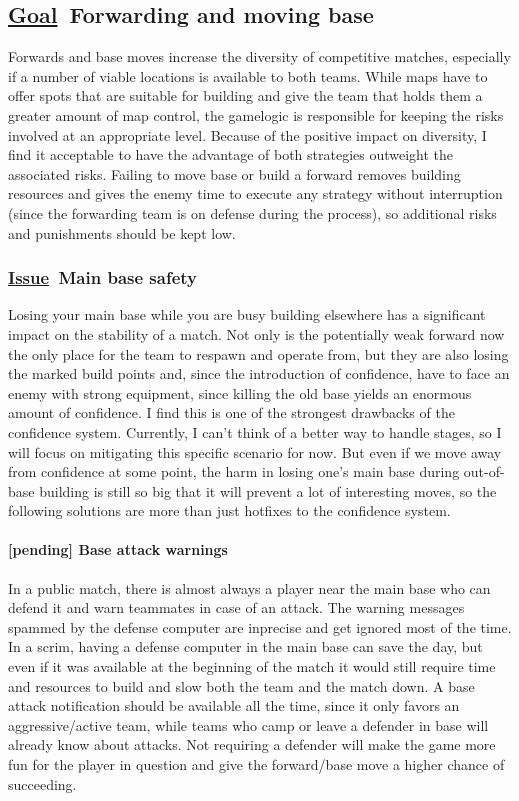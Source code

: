 \documentclass{scrartcl}
\newcommand{\goal}     [0]{\textbf{\underline{Goal}\ }}
\newcommand{\issue}    [0]{\textbf{\underline{Issue}\ }}
\newcommand{\pending}  [0]{\textcolor{pending}  {\textbf{[pending] }}}
\begin{document}
\subsection{\goal Forwarding and moving base}

Forwards and base moves increase the diversity of competitive matches, especially if a number of viable locations is available to both teams. While maps have to offer spots that are suitable for building and give the team that holds them a greater amount of map control, the gamelogic is responsible for keeping the risks involved at an appropriate level. Because of the positive impact on diversity, I find it acceptable to have the advantage of both strategies outweight the associated risks. Failing to move base or build a forward removes building resources and gives the enemy time to execute any strategy without interruption (since the forwarding team is on defense during the process), so additional risks and punishments should be kept low.

\subsubsection{\issue Main base safety}

Losing your main base while you are busy building elsewhere has a significant impact on the stability of a match. Not only is the potentially weak forward now the only place for the team to respawn and operate from, but they are also losing the marked build points and, since the introduction of confidence, have to face an enemy with strong equipment, since killing the old base yields an enormous amount of confidence. I find this is one of the strongest drawbacks of the confidence system. Currently, I can't think of a better way to handle stages, so I will focus on mitigating this specific scenario for now. But even if we move away from confidence at some point, the harm in losing one's main base during out-of-base building is still so big that it will prevent a lot of interesting moves, so the following solutions are more than just hotfixes to the confidence system.

\paragraph{\pending Base attack warnings}

In a public match, there is almost always a player near the main base who can defend it and warn teammates in case of an attack. The warning messages spammed by the defense computer are inprecise and get ignored most of the time. In a scrim, having a defense computer in the main base can save the day, but even if it was available at the beginning of the match it would still require time and resources to build and slow both the team and the match down. A base attack notification should be available all the time, since it only favors an aggressive/active team, while teams who camp or leave a defender in base will already know about attacks. Not requiring a defender will make the game more fun for the player in question and give the forward/base move a higher chance of succeeding.
\end{document}

